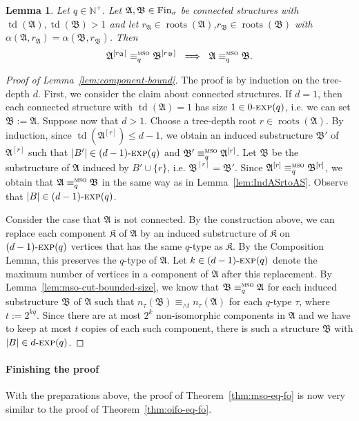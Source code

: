 \documentclass[11pt]{article}
\newtheorem{lemma}[theorem]{Lemma}
\newcommand{\fin}{\textup{Fin}}
\newcommand{\logic}[1]{\textsc{#1}}
\newcommand{\MSO}{\logic{mso}}
\newcommand{\eleq}[1][]{\equiv_{#1}}
\newcommand{\msoeleq}[1][]{\eleq[#1]^{\MSO{}}}
\newcommand{\maxeq}[1]{\equiv_{{\wedge}#1}}
\newcommand{\struct}[1]{\mathfrak{#1}}
\newcommand{\AS}{\struct{A}}
\newcommand{\BS}{\struct{B}}
\newcommand{\KS}{\struct{K}}
\newcommand{\td}{\operatorname{td}}
\DeclareMathOperator{\tdroot}{roots}
\newcommand{\set}[1]{\{#1\}}
\newcommand{\Npos}{\mathbb{N}^{+}}
\newcommand{\union}{\cup}
\newcommand{\nexp}[1][d]{\ensuremath{#1\textnormal{-}\textsc{exp}}}
\begin{document}
\begin{lemma}
  \label{lem:mso-IndASrtoAS}
  Let $q\in \Npos$. Let
  $\AS,\BS\in \fin_\sigma$ be connected structures with $\td(\AS), \td(\BS) > 1$
  and let $r_\AS\in \tdroot(\AS)$,$r_\BS\in \tdroot(\BS)$
  with $\alpha(\AS,r_\AS)=\alpha(\BS,r_\BS)$.
  Then \[ \AS^{[r_\AS]} \msoeleq[q] \BS^{[r_\BS]} \ \implies \ \AS \msoeleq[q] \BS. \]
\end{lemma}
\begin{proof}[Proof of Lemma~\ref{lem:component-bound}]
  The proof is by induction on the tree-depth $d$.  First, we consider the claim
  about connected structures.  If $d=1$, then each connected structure with
  $\td(\AS)=1$ has size $1\in \nexp[0](q)$, i.e. we can set $\BS:=\AS$.  Suppose
  now that $d>1$. Choose a tree-depth root $r\in \tdroot(\AS)$.  By induction,
  since $\td(\AS^{[r]}) \leq d-1$, we obtain an induced substructure $\BS'$ of
  $\AS^{[r]}$ such that $|B'|\in \nexp[(d-1)](q)$ and $\BS' \msoeleq[q]
  \AS^{[r]}$.  Let $\BS$ be the substructure of $\AS$ induced by $B' \union
  \set{r}$, i.e. $\BS^{[r]}=\BS'$. Since $\AS^{[r]} \msoeleq[q] \BS^{[r]}$, we
  obtain that $\AS \msoeleq[q] \BS$ in the same way as in
  Lemma~\ref{lem:IndASrtoAS}. Observe that $|B|\in \nexp[(d-1)](q)$.

  Consider the case that $\AS$ is not connected. By the construction
  above, we can replace each component $\KS$ of $\AS$ by an induced
  substructure of $\KS$ on $\nexp[(d-1)](q)$ vertices that has the
  same $q$-type as $\KS$. By the Composition Lemma, this preserves the
  $q$-type of $\AS$. Let $k\in \nexp[(d-1)](q)$ denote the maximum
  number of vertices in a component of $\AS$ after this
  replacement. By Lemma~\ref{lem:mso-cut-bounded-size}, we know that
  $\BS \msoeleq[q] \AS$ for each induced substructure $\BS$ of $\AS$
  such that $n_{\tau}(\BS) \maxeq{t} n_{\tau}(\AS)$ for each $q$-type
  $\tau$, where $t:=2^{kq}$. Since there are at most $2^k$
  non-isomorphic components in $\AS$ and we have to keep at most $t$
  copies of each such component, there is such a structure $\BS$ with
  $|B|\in \nexp[d](q)$.
\end{proof}

\paragraph{Finishing the proof}

With the preparations above, the proof of Theorem~\ref{thm:mso-eq-fo} is now
very similar to the proof of Theorem~\ref{thm:oifo-eq-fo}. 
\end{document}
